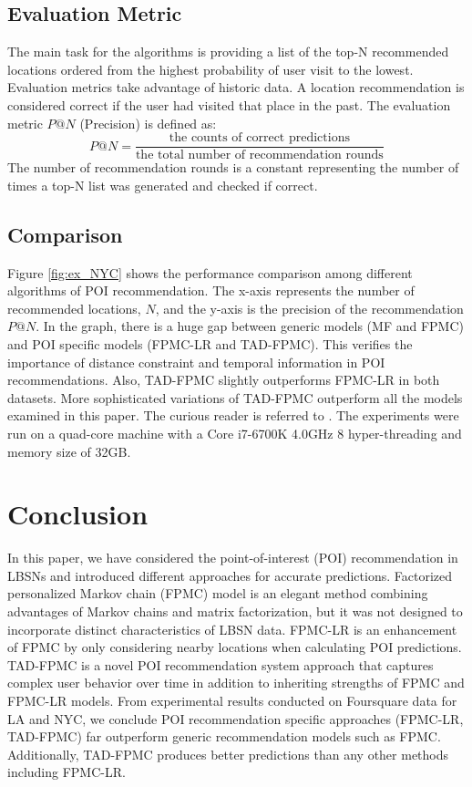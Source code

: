 \documentclass{sig-alternate}
\begin{document}
\subsection{Evaluation Metric}
\label{metic}
The main task for the algorithms is providing a list of the top-N recommended locations
ordered from the highest probability of user visit to the lowest. Evaluation metrics take advantage of historic data.  
A location recommendation is considered correct if the user had visited that place in the past. 
The evaluation metric $P@N$ (Precision) is defined as:
\begin{equation}
	P@N = \frac{\textrm{the counts of correct predictions}} {\textrm{the total number of recommendation rounds}}
\label{eq:P@N}
\end{equation}
The number of recommendation rounds is a constant representing the number of times a top-N list was 
generated and checked if correct.

\subsection{Comparison}
\label{comparison}
Figure \ref{fig:ex_NYC} shows the performance comparison among different algorithms of POI recommendation. 
The x-axis represents the number of recommended locations, $N$, and the y-axis 
is the precision of the recommendation $P@N$. In the graph, there is a huge gap 
between generic models (MF and FPMC) and POI specific models (FPMC-LR and TAD-FPMC). 
This verifies the importance of distance constraint and temporal information in POI recommendations. 
Also, TAD-FPMC slightly outperforms FPMC-LR in both datasets. More sophisticated variations of TAD-FPMC outperform 
all the models examined in this paper. The curious reader is referred to \cite{Li:2017}.
The experiments were run on a quad-core machine with a Core i7-6700K 4.0GHz 8 hyper-threading and memory size of 32GB. \cite{Li:2017} 

\section{Conclusion}
\label{sec:conclusion}

In this paper, we have considered the point-of-interest (POI) recommendation in LBSNs 
and introduced different approaches for accurate predictions. Factorized personalized Markov 
chain (FPMC) model is an elegant method combining advantages of Markov chains and matrix factorization,
but it was not designed to incorporate distinct characteristics of LBSN data. FPMC-LR is an enhancement 
of FPMC by only considering nearby locations when calculating POI predictions. TAD-FPMC is a novel 
POI recommendation system approach that captures complex user behavior over time in addition to inheriting strengths 
of FPMC and FPMC-LR models. From experimental results conducted on Foursquare data for LA and NYC, we conclude 
POI recommendation specific approaches (FPMC-LR, TAD-FPMC) far outperform generic recommendation models such as FPMC.
Additionally, TAD-FPMC produces better predictions than any other methods including FPMC-LR.
\end{document}

